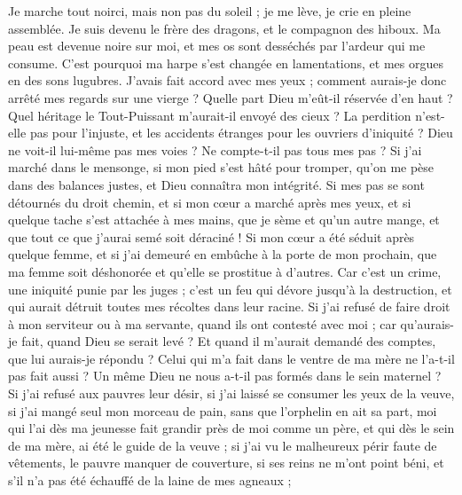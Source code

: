 \begin{multicols}{2}
Je marche tout noirci, mais non pas du soleil ; je me lève, je crie en pleine assemblée. 
Je suis devenu le frère des dragons, et le compagnon des hiboux.
Ma peau est devenue noire sur moi, et mes os sont desséchés par l'ardeur qui me consume.
C'est pourquoi ma harpe s'est changée en lamentations, et mes orgues en des sons lugubres.
\VerseOne{}J'avais fait accord avec mes yeux ; comment aurais-je donc arrêté mes regards sur une vierge ? 
Quelle part Dieu m'eût-il réservée d'en haut ? Quel héritage le Tout-Puissant m'aurait-il envoyé des cieux ?
La perdition n'est-elle pas pour l'injuste, et les accidents étranges pour les ouvriers d'iniquité ?
Dieu ne voit-il lui-même pas mes voies ? Ne compte-t-il pas tous mes pas ?
Si j'ai marché dans le mensonge, si mon pied s'est hâté pour tromper,
qu'on me pèse dans des balances justes, et Dieu connaîtra mon intégrité.
Si mes pas se sont détournés du droit chemin, et si mon cœur a marché après mes yeux, et si quelque tache s'est attachée à mes mains,
que je sème et qu'un autre mange, et que tout ce que j'aurai semé soit déraciné !
Si mon cœur a été séduit après quelque femme, et si j'ai demeuré en embûche à la porte de mon prochain,
que ma femme soit déshonorée et qu'elle se prostitue à d'autres.
Car c'est un crime, une iniquité punie par les juges ;
c'est un feu qui dévore jusqu'à la destruction, et qui aurait détruit toutes mes récoltes dans leur racine.
Si j'ai refusé de faire droit à mon serviteur ou à ma servante, quand ils ont contesté avec moi ;
car qu'aurais-je fait, quand Dieu se serait levé ? Et quand il m'aurait demandé des comptes, que lui aurais-je répondu ?
Celui qui m'a fait dans le ventre de ma mère ne l'a-t-il pas fait aussi ? Un même Dieu ne nous a-t-il pas formés dans le sein maternel ?
Si j'ai refusé aux pauvres leur désir, si j'ai laissé se consumer les yeux de la veuve,
si j'ai mangé seul mon morceau de pain, sans que l'orphelin en ait sa part,
moi qui l'ai dès ma jeunesse fait grandir près de moi comme un père, et qui dès le sein de ma mère, ai été le guide de la veuve ;
si j'ai vu le malheureux périr faute de vêtements, le pauvre manquer de couverture,
si ses reins ne m'ont point béni, et s'il n'a pas été échauffé de la laine de mes agneaux ;

\end{multicols}
